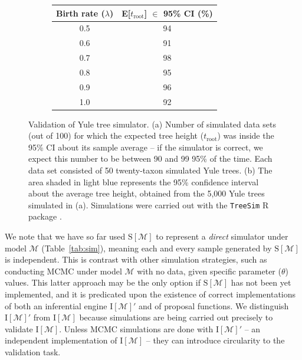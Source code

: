 \documentclass[oneside]{article}
\begin{document}
\begin{figure}
  \centering
  \vspace{0pt}
  \begin{subfigure}[t]{0.5\textwidth}
    \caption{}
    \centering
    \begin{tabular}{ c|c }
    \hline
    Birth rate ($\lambda$) & E[$t_{\text{root}}$] $\in$ 95\% CI (\%)\\
    \hline  
    0.5 & 94\\
    0.6 & 91\\
    0.7 & 98\\
    0.8 & 95\\
    0.9 & 96\\
    1.0 & 92\\
    \hline
  \end{tabular}
  \end{subfigure}
  \vspace{0pt}
  \hspace{1cm}
  \begin{subfigure}[t]{0.4\textwidth}
    \caption{}
    \centering
        
  \end{subfigure}
  \hfill
  \caption{Validation of Yule tree simulator.
    (a) Number of simulated data sets (out of 100) for which the
    expected tree height ($t_{\text{root}}$) was inside the 95\% CI
    about its sample average -- if the simulator is correct, we expect this number to be between 90 and 99 95\% of the time.
    Each data set consisted of 50 twenty-taxon simulated Yule trees.
    (b) The area shaded in light blue represents the
    95\% confidence interval about the average tree height, obtained
    from the 5,000 Yule trees simulated in (a). Simulations were
    carried out with the \texttt{TreeSim} R package \citep{stadler11}.}
  \label{fig:yulemean}
\end{figure}

We note that we have so far used $\text{S}[\mathcal{M}]$ to represent a \emph{direct} simulator under model $\mathcal{M}$ (Table~\ref{tab:sim}), meaning each and every sample generated by $\text{S}[\mathcal{M}]$ is independent.
This is contrast with other simulation strategies, such as conducting MCMC under model $\mathcal{M}$ with no data, given specific parameter ($\theta$) values.
This latter approach may be the only option if $\text{S}[\mathcal{M}]$ has not been yet implemented, and it is predicated upon the existence of correct implementations of both an inferential engine $\text{I}[\mathcal{M}]'$ and of proposal functions.
We distinguish $\text{I}[\mathcal{M}]'$ from $\text{I}[\mathcal{M}]$ because simulations are being carried out precisely to validate $\text{I}[\mathcal{M}]$.
Unless MCMC simulations are done with $\text{I}[\mathcal{M}]'$ -- an independent implementation of $\text{I}[\mathcal{M}]$ -- they can introduce circularity to the validation task.
\end{document}
